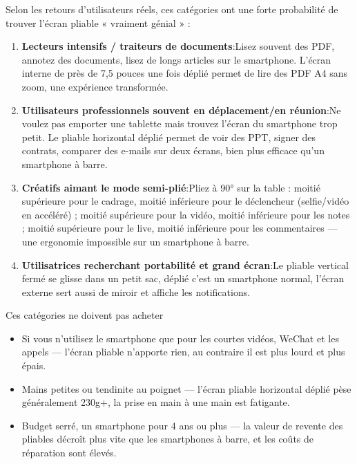 
Selon les retours d'utilisateurs réels, ces catégories ont une forte probabilité de trouver l'écran pliable « vraiment génial » :

\begin{enumerate}
  \item \textbf{Lecteurs intensifs / traiteurs de documents}:Lisez souvent des PDF, annotez des documents, lisez de longs articles sur le smartphone. L’écran interne de près de 7,5 pouces une fois déplié permet de lire des PDF A4 sans zoom, une expérience transformée.
  \item \textbf{Utilisateurs professionnels souvent en déplacement/en réunion}:Ne voulez pas emporter une tablette mais trouvez l’écran du smartphone trop petit. Le pliable horizontal déplié permet de voir des PPT, signer des contrats, comparer des e-mails sur deux écrans, bien plus efficace qu’un smartphone à barre.
  \item \textbf{Créatifs aimant le mode semi-plié}:Pliez à 90° sur la table : moitié supérieure pour le cadrage, moitié inférieure pour le déclencheur (selfie/vidéo en accéléré) ; moitié supérieure pour la vidéo, moitié inférieure pour les notes ; moitié supérieure pour le live, moitié inférieure pour les commentaires — une ergonomie impossible sur un smartphone à barre.
  \item \textbf{Utilisatrices recherchant portabilité et grand écran}:Le pliable vertical fermé se glisse dans un petit sac, déplié c’est un smartphone normal, l’écran externe sert aussi de miroir et affiche les notifications.
\end{enumerate}

\begin{tcbwarn}{Ces catégories ne doivent pas acheter}
\begin{itemize}
  \item Si vous n'utilisez le smartphone que pour les courtes vidéos, WeChat et les appels — l'écran pliable n'apporte rien, au contraire il est plus lourd et plus épais.
  \item Mains petites ou tendinite au poignet — l'écran pliable horizontal déplié pèse généralement 230g+, la prise en main à une main est fatigante.
  \item Budget serré, un smartphone pour 4 ans ou plus — la valeur de revente des pliables décroît plus vite que les smartphones à barre, et les coûts de réparation sont élevés.
\end{itemize}

\end{tcbwarn}

